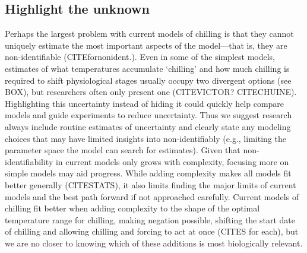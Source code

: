 \documentclass[11pt]{article}
\begin{document}
\subsection*{Highlight the unknown} 
Perhaps the largest problem with current models of chilling is that they cannot uniquely estimate the most important aspects of the model---that is, they are non-identifiable (CITEfornonident.). Even in some of the simplest models, estimates of what temperatures accumulate `chilling' and how much chilling is required to shift physiological stages usually occupy two divergent options (see BOX), but researchers often only present one (CITEVICTOR? CITECHUINE). Highlighting this uncertainty instead of hiding it could quickly help compare models and guide experiments to reduce uncertainty. Thus we suggest research always include routine estimates of uncertainty and clearly state any modeling choices that may have limited insights into non-identifiably (e.g., limiting the parameter space the model can search for estimates). Given that non-identifiability in current models only grows with complexity, focusing more on simple models may aid progress. While adding complexity makes all models fit better generally (CITESTATS), it also limits finding the major limits of current models and the best path forward if not approached carefully. Current models of chilling fit better when adding complexity to the shape of the optimal temperature range for chilling, making negation possible, shifting the start date of chilling and allowing chilling and forcing to act at once (CITES for each), but we are no closer to knowing which of these additions is most biologically relevant. 
\end{document}
